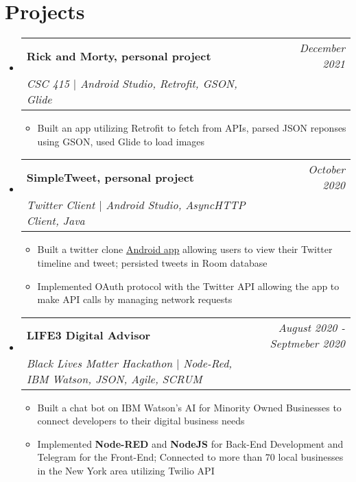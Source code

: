 \documentclass[letterpaper,11pt]{article}
\makeatletter
\newcommand{\resumeItem}[1]{
  \item\small{
    {#1 \vspace{-3pt}}
  }
}
\newcommand{\resumeSubheading}[4]{
  \vspace{-2pt}\item
    \begin{tabular*}{0.97\textwidth}[t]{l@{\extracolsep{\fill}}r}
      \textbf{#1} & #2 \\
      \textit{\small#3} & \textit{\small #4} \\
    \end{tabular*}\vspace{-9pt}
}
\newcommand{\resumeSubHeadingListStart}{\begin{itemize}[leftmargin=0.15in, label={}]}
\newcommand{\resumeSubHeadingListEnd}{\end{itemize}}
\newcommand{\resumeItemListStart}{\begin{itemize}[leftmargin=0.2in]}
\newcommand{\resumeItemListEnd}{\end{itemize}\vspace{-5pt}}
\makeatother
\begin{document}
  
\section{Projects}
    \resumeSubHeadingListStart
    
    \resumeSubheading
      {{\textbf{Rick and Morty}}{\normalfont, personal project}}{\emph{December 2021}}
      {\emph{CSC 415} $|$ Android Studio, Retrofit, GSON, Glide}{}
      \resumeItemListStart
        \resumeItem{Built an app utilizing Retrofit to fetch from APIs, parsed JSON reponses using GSON, used Glide to load images}
      \resumeItemListEnd
    \resumeSubheading
      {{\textbf{SimpleTweet}}{\normalfont, personal project}}{\emph{October 2020}}
      {\emph{Twitter Client} $|$ Android Studio, AsyncHTTP Client, Java}{}
      \resumeItemListStart
        \resumeItem{
        Built a twitter clone
        \href{https://github.com/teddygizachew/SimpleTweet}{\underline{{\color{blue} Android app}}}
        allowing users to view their Twitter timeline and tweet; persisted tweets in Room database}
        \resumeItem{Implemented OAuth protocol with the Twitter API allowing the app to make API calls by managing network requests}
      \resumeItemListEnd
  \resumeSubheading
      {LIFE3 Digital Advisor}{\emph{August 2020 - Septmeber 2020}}
      {\emph{Black Lives Matter Hackathon} $|$ Node-Red, IBM Watson, JSON, Agile, SCRUM}{}
      \resumeItemListStart
        \resumeItem{Built a chat bot on IBM Watson's AI for Minority Owned Businesses to connect developers to their digital business needs}
        \resumeItem{Implemented \textbf{Node-RED} and \textbf{NodeJS} for Back-End Development and Telegram for the Front-End; Connected to more than 70 local businesses in the New York area utilizing Twilio API}
      \resumeItemListEnd
    \resumeSubHeadingListEnd
    
      
\end{document}
